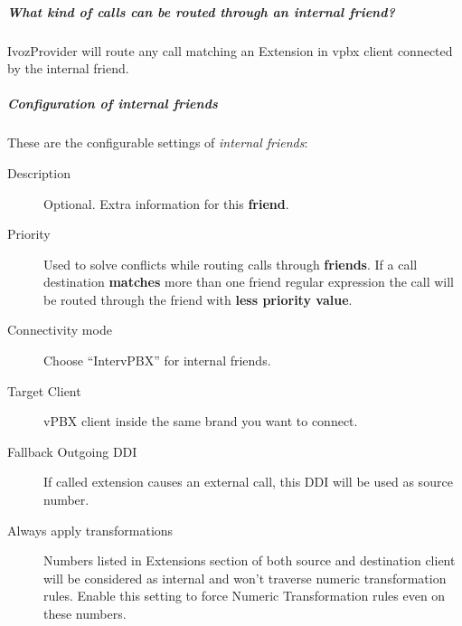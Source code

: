 \documentclass[letterpaper,10pt,spanish]{sphinxmanual}
\begin{document}
\subparagraph{What kind of calls can be routed through an \emph{internal friend}?}
\label{administration_portal/client/vpbx/routing_endpoints/friends/internal_friends:what-kind-of-calls-can-be-routed-through-an-internal-friend}
IvozProvider will route any call matching an Extension in vpbx client connected by the internal friend.


\subparagraph{Configuration of internal friends}
\label{administration_portal/client/vpbx/routing_endpoints/friends/internal_friends:configuration-of-internal-friends}
These are the configurable settings of \emph{internal friends}:
\begin{description}
\item[{Description}] \leavevmode{}\label{administration_portal/client/vpbx/routing_endpoints/friends/internal_friends:term-description}
Optional. Extra information for this \textbf{friend}.

\item[{Priority}] \leavevmode{}\label{administration_portal/client/vpbx/routing_endpoints/friends/internal_friends:term-priority}
Used to solve conflicts while routing calls through \textbf{friends}.
If a call destination \textbf{matches} more than one friend regular expression
the call will be routed through the friend with \textbf{less priority value}.

\item[{Connectivity mode}] \leavevmode{}\label{administration_portal/client/vpbx/routing_endpoints/friends/internal_friends:term-connectivity-mode}
Choose ``IntervPBX'' for internal friends.

\item[{Target Client}] \leavevmode{}\label{administration_portal/client/vpbx/routing_endpoints/friends/internal_friends:term-target-client}
vPBX client inside the same brand you want to connect.

\item[{Fallback Outgoing DDI}] \leavevmode{}\label{administration_portal/client/vpbx/routing_endpoints/friends/internal_friends:term-fallback-outgoing-ddi}
If called extension causes an external call, this DDI will be used as source number.

\item[{Always apply transformations}] \leavevmode{}\label{administration_portal/client/vpbx/routing_endpoints/friends/internal_friends:term-always-apply-transformations}
Numbers listed in Extensions section of both source and destination client will be considered as internal and
won't traverse numeric transformation rules. Enable this setting to force Numeric Transformation rules even on these numbers.

\end{description}
\end{document}
